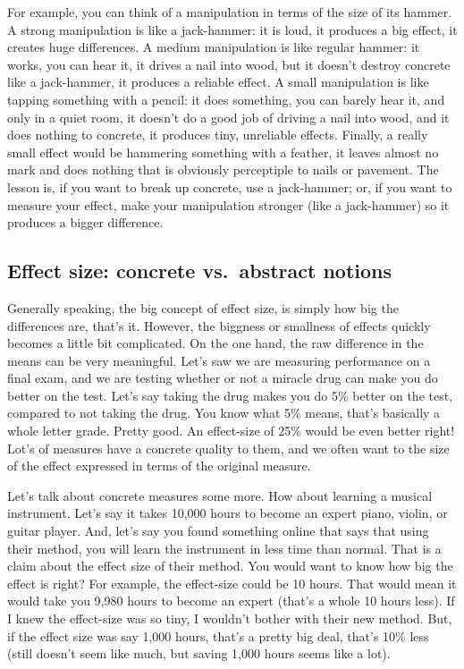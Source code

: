 \documentclass[
]{book}
\begin{document}
For example, you can think of a manipulation in terms of the size of its hammer. A strong manipulation is like a jack-hammer: it is loud, it produces a big effect, it creates huge differences. A medium manipulation is like regular hammer: it works, you can hear it, it drives a nail into wood, but it doesn't destroy concrete like a jack-hammer, it produces a reliable effect. A small manipulation is like tapping something with a pencil: it does something, you can barely hear it, and only in a quiet room, it doesn't do a good job of driving a nail into wood, and it does nothing to concrete, it produces tiny, unreliable effects. Finally, a really small effect would be hammering something with a feather, it leaves almost no mark and does nothing that is obviously perceptiple to nails or pavement. The lesson is, if you want to break up concrete, use a jack-hammer; or, if you want to measure your effect, make your manipulation stronger (like a jack-hammer) so it produces a bigger difference.

\hypertarget{effect-size-concrete-vs.-abstract-notions}{%
\subsection{Effect size: concrete vs.~abstract notions}\label{effect-size-concrete-vs.-abstract-notions}}

Generally speaking, the big concept of effect size, is simply how big the differences are, that's it. However, the biggness or smallness of effects quickly becomes a little bit complicated. On the one hand, the raw difference in the means can be very meaningful. Let's saw we are measuring performance on a final exam, and we are testing whether or not a miracle drug can make you do better on the test. Let's say taking the drug makes you do 5\% better on the test, compared to not taking the drug. You know what 5\% means, that's basically a whole letter grade. Pretty good. An effect-size of 25\% would be even better right! Lot's of measures have a concrete quality to them, and we often want to the size of the effect expressed in terms of the original measure.

Let's talk about concrete measures some more. How about learning a musical instrument. Let's say it takes 10,000 hours to become an expert piano, violin, or guitar player. And, let's say you found something online that says that using their method, you will learn the instrument in less time than normal. That is a claim about the effect size of their method. You would want to know how big the effect is right? For example, the effect-size could be 10 hours. That would mean it would take you 9,980 hours to become an expert (that's a whole 10 hours less). If I knew the effect-size was so tiny, I wouldn't bother with their new method. But, if the effect size was say 1,000 hours, that's a pretty big deal, that's 10\% less (still doesn't seem like much, but saving 1,000 hours seems like a lot).
\end{document}
